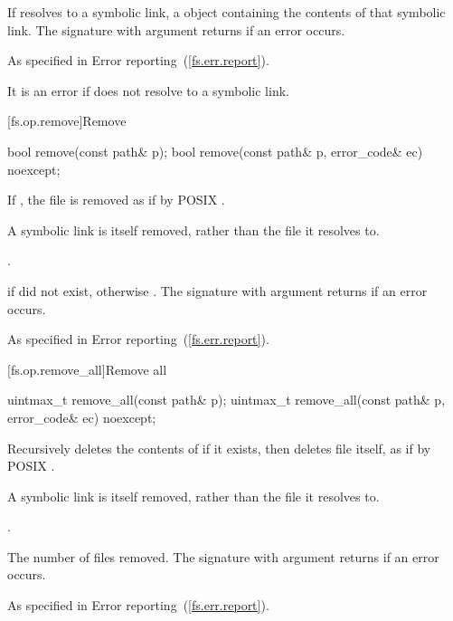 \begin{itemdescr}
\pnum
\returns If  resolves to a symbolic
  link, a  object containing the contents of that symbolic
  link. The signature with argument 
  returns  if an error occurs.

\pnum
\throws As specified in Error reporting~(\ref{fs.err.report}). \begin{note} It is an error if  does not
  resolve to a symbolic link. \end{note}
\end{itemdescr}


[fs.op.remove]{Remove}

\begin{itemdecl}
bool remove(const path& p);
bool remove(const path& p, error_code& ec) noexcept;
\end{itemdecl}

\begin{itemdescr}
\pnum
\effects If , the file  is
  removed as if by POSIX .
\begin{note} A symbolic link is itself removed, rather than the file it
  resolves to. \end{note}

\pnum
\postcondition {}.

\pnum
\returns {} if  did not exist,
  otherwise . The signature with argument 
  returns  if an error occurs.

\pnum
\throws As specified in Error reporting~(\ref{fs.err.report}).
\end{itemdescr}


[fs.op.remove_all]{Remove all}

\begin{itemdecl}
uintmax_t remove_all(const path& p);
uintmax_t remove_all(const path& p, error_code& ec) noexcept;
\end{itemdecl}

\begin{itemdescr}
\pnum
\effects Recursively deletes the contents of  if it exists,
  then deletes file  itself, as if by POSIX .
\begin{note} A symbolic link is itself removed, rather than the file it
  resolves to. \end{note}

\pnum
\postcondition {}.

\pnum
\returns The number of files removed. The signature with argument
   returns  if an error
  occurs.

\pnum
\throws As specified in Error reporting~(\ref{fs.err.report}).
\end{itemdescr}


